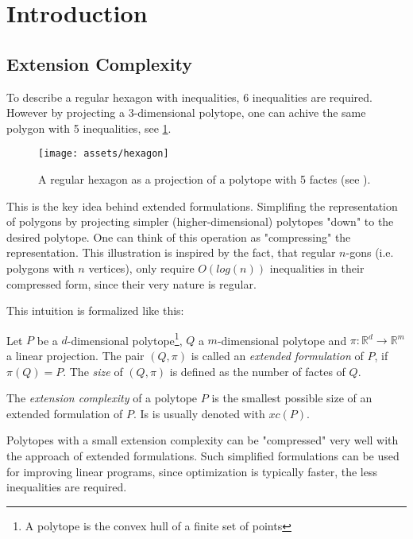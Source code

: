 \section{Introduction} 

\subsection{Extension Complexity}

To describe a regular hexagon with inequalities, 6 inequalities are required. However by projecting a 3-dimensional polytope, one can achive the same polygon with 5 inequalities, see \ref{fig:hexagon}. 

\begin{figure}[h]
  \centering
  \texttt{[image: assets/hexagon]}
  \caption{A regular hexagon as a projection of a polytope with 5 factes (see \cite{kwan2020extension}).}
  \label{fig:hexagon}
\end{figure}

This is the key idea behind extended formulations. Simplifing the representation of polygons by projecting simpler (higher-dimensional) polytopes "down" to the desired polytope.
One can think of this operation as "compressing" the representation. This illustration is inspired by the fact, that regular $n$-gons (i.e. polygons with $n$ vertices), only require $O(log(n))$ inequalities in their compressed form, since their very nature is regular.

This intuition is formalized like this:

\begin{definition}
  Let $P$ be a $d$-dimensional polytope\footnote{A polytope is the convex hull of a finite set of points}, $Q$ a $m$-dimensional polytope and $\pi:\mathbb{R}^d \to \mathbb{R}^m$ a linear projection.
  The pair $(Q,\pi)$ is called an \textit{extended formulation} of $P$, if $\pi(Q)=P$. The \textit{size} of $(Q,\pi)$ is defined as the number of factes of $Q$.
\end{definition}

\begin{definition}
  The \textit{extension complexity} of a polytope $P$ is the smallest possible size of an extended formulation of $P$. Is is usually denoted with $xc(P)$.
\end{definition}

Polytopes with a small extension complexity can be "compressed" very well with the approach of extended formulations.
Such simplified formulations can be used for improving linear programs, since optimization is typically faster, the less inequalities are required.



